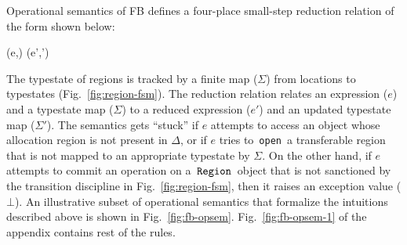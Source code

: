 \documentclass[a4paper,UKenglish]{lipics-v2018}
\newcommand{\C}[1]{\code{#1}}
\newcommand{\code}[1]{\,{\tt #1}\,}
\newcommand{\spc}[0]{\quad}
\newcommand{\FB}{{\sc FB}\xspace}
\newcommand{\RgnZ}{\C{Region}}
\newcommand{\inang}[1]{\langle #1 \rangle}
\newcommand{\ralloc}{\pi^a}
\newcommand{\tbar}{\bar{T}}
\renewcommand{\bar}[1]{\overline{#1}}
\newcommand{\rhoenv}{\Delta}
\newcommand{\invalidexn}{\bot}
\newcommand{\redstoo}[3]{#2 \longrightarrow #3} %
\newcommand{\loc}{\mathtt{l}}
\newcommand{\locbar}{\overline{\loc}}
\newcommand{\mem}{\Sigma}
\newcommand{\rulelabel}[1]{\textrm{\sc {#1}}}
\newcommand{\RULE}[2]{\frac{\begin{array}{c}#1\end{array}}
                           {\begin{array}{c}#2\end{array}}}
\newenvironment{nop}{}{}
\newenvironment{smathpar}{
\begin{nop}\small\begin{mathpar}}{
\end{mathpar}\end{nop}\ignorespacesafterend}
\begin{document}
Operational semantics of \FB defines a four-place small-step reduction
relation of the form shown below:
\begin{smathpar}
  \redstoo{\rhoenv}{(e,\mem)}{(e',\mem')}
\end{smathpar}
The typestate of regions is tracked by a finite map ($\mem$) from
locations to typestates (Fig.~\ref{fig:region-fsm}). The reduction
relation relates an expression ($e$) and a typestate map ($\mem$) to a
reduced expression ($e'$) and an updated typestate map ($\mem'$). The
semantics gets ``stuck'' if $e$ attempts to access an object whose
allocation region is not present in $\rhoenv$, or if $e$ tries to
\C{open} a transferable region that is not mapped to an appropriate
typestate by $\mem$.  On the other hand, if $e$ attempts to commit an
operation on a $\RgnZ$ object that is not sanctioned by the transition
discipline in Fig.~\ref{fig:region-fsm}, then it raises an exception
value ($\invalidexn$). An illustrative subset of operational semantics
that formalize the intuitions described above is shown in
Fig.~\ref{fig:fb-opsem}.  Fig.~\ref{fig:fb-opsem-1} of the appendix
contains rest of the rules. 

\newcommand{\opsemrule}[3]{%
\begin{minipage}{#1}\begin{smathpar}\begin{array}{c}%
\renewcommand*{\arraystretch}{1.2}%
\RULE {#2} {#3}%
\end{array}\end{smathpar}\end{minipage}%
}
\newcommand{\lopsemrule}[4]{%
\begin{minipage}{#1}\begin{smathpar}\begin{array}{c}%
\renewcommand*{\arraystretch}{1.2}%
[\rulelabel{#4}] \spc \RULE {#2} {#3}%
\end{array}\end{smathpar}\end{minipage}%
}
%
\newcommand{\anobjty}[0]{B\inang{\tbar}\inang{\ralloc\locbar}}
\newcommand{\anobj}[0]{\C{new} \; \anobjty(\bar{v})}
%
\end{document}
